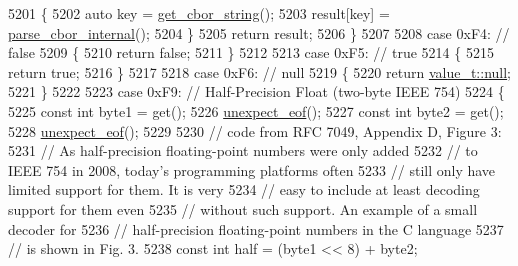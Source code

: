 \begin{DoxyCode}
5201                 \{
5202                     \textcolor{keyword}{auto} key = \hyperlink{classnlohmann_1_1detail_1_1binary__reader_ac626ec37d1724d9d36d918c6361f8e57}{get\_cbor\_string}();
5203                     result[key] = \hyperlink{classnlohmann_1_1detail_1_1binary__reader_a0d919ee892fbbeedb27ff95c4e4010e1}{parse\_cbor\_internal}();
5204                 \}
5205                 \textcolor{keywordflow}{return} result;
5206             \}
5207 
5208             \textcolor{keywordflow}{case} 0xF4: \textcolor{comment}{// false}
5209             \{
5210                 \textcolor{keywordflow}{return} \textcolor{keyword}{false};
5211             \}
5212 
5213             \textcolor{keywordflow}{case} 0xF5: \textcolor{comment}{// true}
5214             \{
5215                 \textcolor{keywordflow}{return} \textcolor{keyword}{true};
5216             \}
5217 
5218             \textcolor{keywordflow}{case} 0xF6: \textcolor{comment}{// null}
5219             \{
5220                 \textcolor{keywordflow}{return} \hyperlink{namespacenlohmann_1_1detail_a1ed8fc6239da25abcaf681d30ace4985a37a6259cc0c1dae299a7866489dff0bd}{value\_t::null};
5221             \}
5222 
5223             \textcolor{keywordflow}{case} 0xF9: \textcolor{comment}{// Half-Precision Float (two-byte IEEE 754)}
5224             \{
5225                 \textcolor{keyword}{const} \textcolor{keywordtype}{int} byte1 = \textcolor{keyword}{get}();
5226                 \hyperlink{classnlohmann_1_1detail_1_1binary__reader_a1dfc55484af3a896c376b41cd99f3e15}{unexpect\_eof}();
5227                 \textcolor{keyword}{const} \textcolor{keywordtype}{int} byte2 = \textcolor{keyword}{get}();
5228                 \hyperlink{classnlohmann_1_1detail_1_1binary__reader_a1dfc55484af3a896c376b41cd99f3e15}{unexpect\_eof}();
5229 
5230                 \textcolor{comment}{// code from RFC 7049, Appendix D, Figure 3:}
5231                 \textcolor{comment}{// As half-precision floating-point numbers were only added}
5232                 \textcolor{comment}{// to IEEE 754 in 2008, today's programming platforms often}
5233                 \textcolor{comment}{// still only have limited support for them. It is very}
5234                 \textcolor{comment}{// easy to include at least decoding support for them even}
5235                 \textcolor{comment}{// without such support. An example of a small decoder for}
5236                 \textcolor{comment}{// half-precision floating-point numbers in the C language}
5237                 \textcolor{comment}{// is shown in Fig. 3.}
5238                 \textcolor{keyword}{const} \textcolor{keywordtype}{int} half = (byte1 << 8) + byte2;

\end{DoxyCode}
